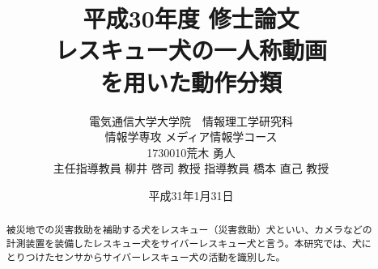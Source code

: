 \documentclass[a4j,12pt]{jreport}
\title{
	平成30年度 修士論文\vspace{1cm}\\
	\huge  レスキュー犬の一人称動画\\を用いた動作分類\vspace{6cm}
}
\author{
	電気通信大学大学院　情報理工学研究科\\
	情報学専攻 メディア情報学コース\\
	1730010\hspace{1cm}荒木 勇人\\
	主任指導教員 柳井 啓司 教授
        指導教員 橋本 直己 教授
}
\date{
平成31年1月31日
}
\begin{document}
\maketitle
\thispagestyle{empty}
\pagebreak

\begin{abstract}

被災地での災害救助を補助する犬をレスキュー（災害救助）犬といい、カメラなどの計測装置を装備したレスキュー犬をサイバーレスキュー犬と言う。本研究では、犬にとりつけたセンサからサイバーレスキュー犬の活動を識別した。


\par


\end{abstract}

\pagestyle{jgraduate}


\tableofcontents

\pagebreak

\newpage











%

\end{document}
